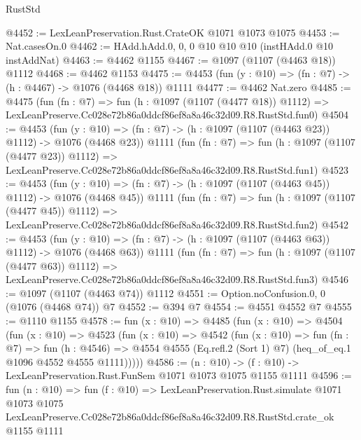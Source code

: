 \begin{lexlean}{RustStd}
\begin{coremodule}
@4452 := LexLeanPreservation.Rust.CrateOK @1071 @1073 @1075
@4453 := Nat.casesOn.{0}
@4462 := HAdd.hAdd.{0, 0, 0} @10 @10 @10 (instHAdd.{0} @10 instAddNat)
@4463 := @4462 @1155
@4467 := @1097 (@1107 (@4463 @18)) @1112
@4468 := @4462 @1153
@4475 := @4453 (fun (y : @10) => (fn : @7) -> (h : @4467) -> @1076 (@4468 @18)) @1111
@4477 := @4462 Nat.zero
@4485 := @4475
    (fun (fn : @7) =>
    fun (h : @1097 (@1107 (@4477 @18)) @1112) =>
    LexLeanPreserve.Cc028e72b86a0ddcf86ef8a8a46c32d09.R8.RustStd.fun0)
@4504 := @4453
    (fun (y : @10) => (fn : @7) -> (h : @1097 (@1107 (@4463 @23)) @1112) -> @1076 (@4468 @23))
    @1111
    (fun (fn : @7) =>
    fun (h : @1097 (@1107 (@4477 @23)) @1112) =>
    LexLeanPreserve.Cc028e72b86a0ddcf86ef8a8a46c32d09.R8.RustStd.fun1)
@4523 := @4453
    (fun (y : @10) => (fn : @7) -> (h : @1097 (@1107 (@4463 @45)) @1112) -> @1076 (@4468 @45))
    @1111
    (fun (fn : @7) =>
    fun (h : @1097 (@1107 (@4477 @45)) @1112) =>
    LexLeanPreserve.Cc028e72b86a0ddcf86ef8a8a46c32d09.R8.RustStd.fun2)
@4542 := @4453
    (fun (y : @10) => (fn : @7) -> (h : @1097 (@1107 (@4463 @63)) @1112) -> @1076 (@4468 @63))
    @1111
    (fun (fn : @7) =>
    fun (h : @1097 (@1107 (@4477 @63)) @1112) =>
    LexLeanPreserve.Cc028e72b86a0ddcf86ef8a8a46c32d09.R8.RustStd.fun3)
@4546 := @1097 (@1107 (@4463 @74)) @1112
@4551 := Option.noConfusion.{0, 0} (@1076 (@4468 @74)) @7
@4552 := @394 @7
@4554 := @4551 @4552 @7
@4555 := @1110 @1155
@4578 := fun (x : @10) =>
  @4485
    (fun (x : @10) =>
    @4504
      (fun (x : @10) =>
      @4523
        (fun (x : @10) =>
        @4542
          (fun (x : @10) =>
          fun (fn : @7) =>
          fun (h : @4546) =>
          @4554 @4555 (Eq.refl.{2} (Sort 1) @7) (heq_of_eq.{1} @1096 @4552 @4555 @1111)))))
@4586 := (n : @10) -> (f : @10) -> LexLeanPreservation.Rust.FunSem @1071 @1073 @1075 @1155 @1111
@4596 := fun (n : @10) =>
  fun (f : @10) =>
  LexLeanPreservation.Rust.simulate
    @1071
    @1073
    @1075
    LexLeanPreserve.Cc028e72b86a0ddcf86ef8a8a46c32d09.R8.RustStd.crate_ok
    @1155
    @1111
\end{coremodule}
\end{lexlean}
